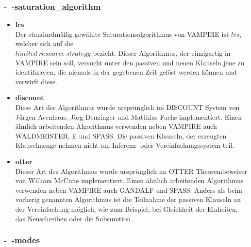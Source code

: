 \documentclass{article}
\begin{document}
\subsubsection{-~-saturation\_algorithm}
\label{subsubsec: commandssaturationalgorithm}
\begin{itemize}
	\item \textbf{lrs}\\
	Der standardmäßig gewählte Saturationsalgorithmus von VAMPIRE ist $lrs$, welcher sich auf die \\$ limited~resource~strategy $ bezieht.
	Dieser Algorithmus, der einzigartig in VAMPIRE sein soll, versucht unter den passiven und neuen Klauseln jene zu identifizieren, die niemals in der gegebenen Zeit gelöst werden können und verwirft diese. \cite{riazanov2003limited} \\
	\item \textbf{discount}\\
	Diese Art des Algorithmus wurde ursprünglich im DISCOUNT System von Jürgen Avenhaus, Jörg Denzinger und Matthias Fuchs implementiert.
	Einen ähnlich arbeitenden Algorithmus verwenden neben VAMPIRE auch WALDMEISTER, E und SPASS. 
	Die passiven Klauseln, der erzeugten Klauselmenge nehmen nicht am Inferenz- oder Vereinfachungssystem teil. \cite{riazanov2003limited} \\
	\item \textbf{otter}\\
	Dieser Art des Algorithmus wurde ursprünglich im OTTER Theorembeweiser von William McCune implementiert.
	Einen ähnlich arbeitenden Algorithmus verwenden neben VAMPIRE auch GANDALF und SPASS. 
	Anders als beim vorherig genannten Algorithmus ist die Teilnahme der passiven Klauseln an der Vereinfachung möglich, wie zum Beispiel, bei Gleichheit der Einheiten, das Neuschreiben oder die Subsumtion. \cite{riazanov2003limited} \\
\end{itemize}

\subsubsection{-~-modes}
\label{subsubsec:commandsmodes}
\end{document}
